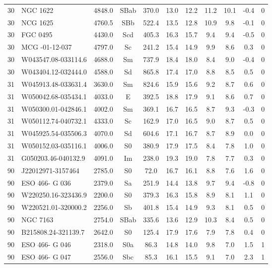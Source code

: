 {\begin{longtable}{clccccccccc}
 30 & NGC 1622 & 4848.0 & SBab & 370.0 & 13.0 & 12.2 & 11.2 & 10.1 & -0.4 & 0 \\ 
 30 & NCG 1625 & 4760.5 & SBb & 522.4 & 13.5 & 12.8 & 10.9 & 9.8 & -0.1 & 0 \\ 
 30 & FGC 0495 & 4430.0 & Scd & 405.3 & 16.3 & 15.7 & 9.4 & 9.4 & -0.5 & 0 \\ 
 30 & MCG -01-12-037 & 4797.0 & Sc & 241.2 & 15.4 & 14.9 & 9.9 & 8.6 & 0.3 & 0 \\ 
 30 & W043547.08-033114.6 & 4688.0 & Sm & 737.9 & 18.4 & 18.0 & 8.4 & 9.0 & -0.4 & 0 \\ 
 30 & W043404.12-032444.0 & 4588.0 & Sd & 865.8 & 17.4 & 17.0 & 8.8 & 8.5 & 0.5 & 0 \\ 
 31 & W045913.48-033631.4 & 3630.0 & Sm & 824.6 & 15.9 & 15.6 & 9.2 & 8.7 & 0.6 & 0 \\ 
 31 & W050042.68-035434.1 & 4033.0 & E & 392.5 & 18.8 & 17.9 & 9.1 & 8.6 & 0.7 & 0 \\ 
 31 & W050300.01-042846.1 & 4002.0 & Sm & 369.1 & 16.7 & 16.5 & 8.7 & 9.3 & -0.3 & 0 \\ 
 31 & W050112.74-040732.1 & 4333.0 & Sc & 162.9 & 17.0 & 16.5 & 9.0 & 8.7 & 0.5 & 0 \\ 
 31 & W045925.54-035506.3 & 4070.0 & Sd & 604.6 & 17.1 & 16.7 & 8.7 & 8.9 & 0.0 & 0 \\ 
 31 & W050152.03-035116.1 & 4006.0 & S0 & 380.9 & 17.9 & 17.5 & 8.4 & 7.8 & 1.0 & 0 \\ 
 31 & G050203.46-040132.9 & 4091.0 & Im & 238.0 & 19.3 & 19.0 & 7.8 & 7.7 & 0.3 & 0 \\ 
 90 & J22012971-3157464 & 2785.0 & S0 & 72.0 & 16.7 & 16.1 & 8.8 & 7.6 & 1.6 & 0 \\ 
 90 & ESO 466- G 036 & 2379.0 & Sa & 251.9 & 14.4 & 13.8 & 9.7 & 9.4 & -0.8 & 0 \\ 
 90 & W220250.16-323436.9 & 2200.0 & S0 & 379.3 & 16.3 & 15.8 & 8.9 & 8.1 & 1.1 & 0 \\ 
 90 & W220521.01-320000.2 & 2256.0 & Sb & 401.8 & 15.4 & 14.9 & 9.3 & 8.1 & 0.5 & 0 \\ 
 90 & NGC 7163 & 2754.0 & SBab & 335.6 & 13.6 & 12.9 & 10.3 & 8.4 & 0.5 & 0 \\ 
 90 & B215808.24-321139.7 & 2642.0 & S0 & 125.4 & 17.9 & 17.6 & 7.9 & 7.8 & 0.4 & 0 \\ 
 90 & ESO 466- G 046 & 2318.0 & S0a & 86.3 & 14.8 & 14.0 & 9.8 & 7.0 & 1.5 & 1 \\ 
 90 & ESO 466- G 047 & 2556.0 & Sbc & 85.3 & 16.1 & 15.5 & 9.1 & 7.0 & 2.3 & 1 \\ 

\end{longtable}}
